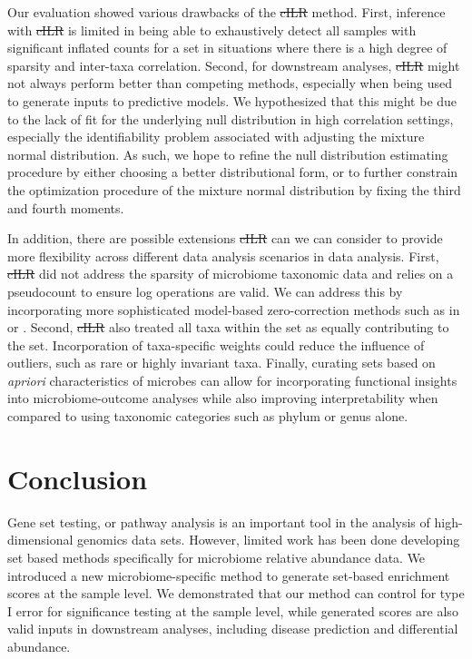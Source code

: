 \documentclass[10pt,letterpaper]{article}
\providecommand{\DIFaddtex}[1]{{\protect\color{blue}\uwave{#1}}} %
\providecommand{\DIFdeltex}[1]{{\protect\color{red}\sout{#1}}}                      %
\providecommand{\DIFaddbegin}{} %
\providecommand{\DIFaddend}{} %
\providecommand{\DIFdelbegin}{} %
\providecommand{\DIFdelend}{} %
\providecommand{\DIFadd}[1]{\texorpdfstring{\DIFaddtex{#1}}{#1}} %
\providecommand{\DIFdel}[1]{\texorpdfstring{\DIFdeltex{#1}}{}} %
\newcommand{\DIFscaledelfig}{0.5}
\newlength{\DIFdelgraphicswidth} %
\newlength{\DIFdelgraphicsheight} %
\newcommand{\DIFaddincludegraphics}[2][]{{\color{blue}\fbox{\DIFOincludegraphics[#1]{#2}}}} %
\newcommand{\DIFdelincludegraphics}[2][]{%
\sbox{\DIFdelgraphicsbox}{\DIFOincludegraphics[#1]{#2}}%
\settoboxwidth{\DIFdelgraphicswidth}{\DIFdelgraphicsbox} %
\settoboxtotalheight{\DIFdelgraphicsheight}{\DIFdelgraphicsbox} %
\scalebox{\DIFscaledelfig}{%
\parbox[b]{\DIFdelgraphicswidth}{\usebox{\DIFdelgraphicsbox}\\[-\baselineskip] \rule{\DIFdelgraphicswidth}{0em}}\llap{\resizebox{\DIFdelgraphicswidth}{\DIFdelgraphicsheight}{%
\setlength{\unitlength}{\DIFdelgraphicswidth}%
\begin{picture}(1,1)%
\thicklines\linethickness{2pt} %
{\color[rgb]{1,0,0}\put(0,0){\framebox(1,1){}}}%
{\color[rgb]{1,0,0}\put(0,0){\line( 1,1){1}}}%
{\color[rgb]{1,0,0}\put(0,1){\line(1,-1){1}}}%
\end{picture}%
}\hspace*{3pt}}} %
} %
\DeclareRobustCommand{\DIFaddbegin}{\DIFOaddbegin \let\includegraphics\DIFaddincludegraphics} %
\DeclareRobustCommand{\DIFaddend}{\DIFOaddend \let\includegraphics\DIFOincludegraphics} %
\DeclareRobustCommand{\DIFdelbegin}{\DIFOdelbegin \let\includegraphics\DIFdelincludegraphics} %
\DeclareRobustCommand{\DIFdelend}{\DIFOaddend \let\includegraphics\DIFOincludegraphics} %
\begin{document}
Our evaluation showed various drawbacks of the \DIFdelbegin \DIFdel{cILR }\DIFdelend \DIFaddbegin \DIFadd{CBEA }\DIFaddend method. First, inference with \DIFdelbegin \DIFdel{cILR }\DIFdelend \DIFaddbegin \DIFadd{CBEA }\DIFaddend is limited in being able to exhaustively detect all samples with significant inflated counts for a set in situations where there is a high degree of sparsity and inter-taxa correlation. Second, for downstream analyses, \DIFdelbegin \DIFdel{cILR }\DIFdelend \DIFaddbegin \DIFadd{CBEA }\DIFaddend might not always perform better than competing methods, especially when being used to generate inputs to predictive models. We hypothesized that this might be due to the lack of fit for the underlying null distribution in high correlation settings, especially the identifiability problem associated with adjusting the mixture normal distribution. As such, we hope to refine the null distribution estimating procedure by either choosing a better distributional form, or to further constrain the optimization procedure of the mixture normal distribution by fixing the third and fourth moments. 

In addition, there are possible extensions \DIFdelbegin \DIFdel{cILR }\DIFdelend \DIFaddbegin \DIFadd{CBEA }\DIFaddend can we can consider to provide more flexibility across different data analysis scenarios in data analysis. First, \DIFdelbegin \DIFdel{cILR }\DIFdelend \DIFaddbegin \DIFadd{CBEA }\DIFaddend did not address the sparsity of microbiome taxonomic data and relies on a pseudocount to ensure log operations are valid. We can address this by incorporating more sophisticated model-based zero-correction methods such as in \cite{martin-fernandez2012} or \cite{kaul2017a}. Second, \DIFdelbegin \DIFdel{cILR }\DIFdelend \DIFaddbegin \DIFadd{CBEA }\DIFaddend also treated all taxa within the set as equally contributing to the set. Incorporation of taxa-specific weights could reduce the influence of outliers, such as rare or highly invariant taxa. Finally, curating sets based on \emph{apriori} characteristics of microbes can allow for incorporating functional insights into microbiome-outcome analyses while also improving interpretability when compared to using taxonomic categories such as phylum or genus alone.  

\section*{Conclusion}
Gene set testing, or pathway analysis is an important tool in the analysis of high-dimensional genomics data sets. However, limited work has been done developing set based methods specifically for microbiome relative abundance data. We introduced a new microbiome-specific method to generate set-based enrichment scores at the sample level. We demonstrated that our method can control for type I error for significance testing at the sample level, while generated scores are also valid inputs in downstream analyses, including disease prediction and differential abundance.  
\end{document}
